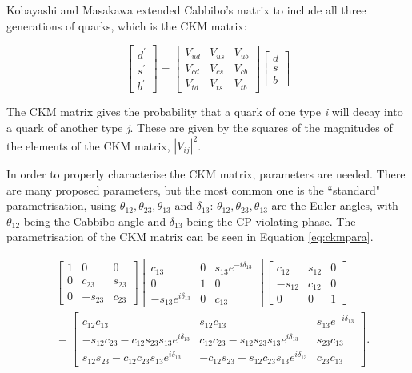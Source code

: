 \documentclass[11pt,oneside,a4paper]{article}
\begin{document}
Kobayashi and Masakawa extended Cabbibo's matrix to include all three generations of quarks, which is the CKM matrix:

\begin{equation}
{\begin{bmatrix}d^{\prime }\\s^{\prime }\\b^{\prime }\end{bmatrix}}={\begin{bmatrix}V_{ud}&V_{us}&V_{ub}\\V_{cd}&V_{cs}&V_{cb}\\V_{td}&V_{ts}&V_{tb}\end{bmatrix}}{\begin{bmatrix}d\\s\\b\end{bmatrix}}
\end{equation}

The CKM matrix gives the probability that a quark of one type \textit{i} will decay into a quark of another type \textit{j}. These are given by the squares of the magnitudes of the elements of the CKM matrix, $|V_{ij}|^2$.

In order to properly characterise the CKM matrix, parameters are needed. There are many proposed parameters, but the most common one is the ``standard" parametrisation, using $\theta_{12},\theta_{23},\theta_{13}$ and $\delta_{13}$: $\theta_{12},\theta_{23},\theta_{13}$ are the Euler angles, with $\theta_{12}$ being the Cabbibo angle and $\delta_{13}$ being the CP violating phase. The parametrisation of the CKM matrix can be seen in Equation \ref{eq:ckmpara}.

\begin{equation}
\label{eq:ckmpara}
{\begin{aligned}&{\begin{bmatrix}1&0&0\\0&c_{23}&s_{23}\\0&-s_{23}&c_{23}\end{bmatrix}}{\begin{bmatrix}c_{13}&0&s_{13}e^{-i\delta _{13}}\\0&1&0\\-s_{13}e^{i\delta _{13}}&0&c_{13}\end{bmatrix}}{\begin{bmatrix}c_{12}&s_{12}&0\\-s_{12}&c_{12}&0\\0&0&1\end{bmatrix}}\\&={\begin{bmatrix}c_{12}c_{13}&s_{12}c_{13}&s_{13}e^{-i\delta _{13}}\\-s_{12}c_{23}-c_{12}s_{23}s_{13}e^{i\delta _{13}}&c_{12}c_{23}-s_{12}s_{23}s_{13}e^{i\delta _{13}}&s_{23}c_{13}\\s_{12}s_{23}-c_{12}c_{23}s_{13}e^{i\delta _{13}}&-c_{12}s_{23}-s_{12}c_{23}s_{13}e^{i\delta _{13}}&c_{23}c_{13}\end{bmatrix}}.\end{aligned}}
\end{equation}
\end{document}

